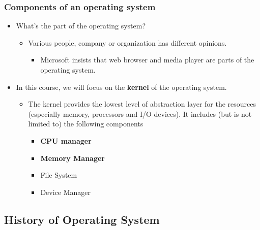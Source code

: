\documentclass[CJKutf8,xcolor=pdftex,dvipsnames,table]{beamer}
\begin{document}
\begin{CJK*}{UTF8}{song}
  \begin{frame}
    \frametitle{Components of an operating system} \pause
	  \begin{itemize}
	  \item{What's the part of the operating system?} \pause
	    \begin{itemize}
	    \item{Various people, company or organization has different opinions.} \pause
	      \begin{itemize}
	      \item{Microsoft insists that web browser and media player are parts of the operating system.} \pause
	      \end{itemize}
	    \end{itemize}
	  \item{In this course, we will focus on the \textbf{kernel} of the operating system.} \pause
	    \begin{itemize}
	    \item{The kernel provides the lowest level of abstraction layer for the resources (especially memory, processors and I/O devices). It includes (but is not limited to) the following components} \pause
	      \begin{itemize}
	      \item{\textbf{CPU manager}} \pause
	      \item{\textbf{Memory Manager}} \pause
	      \item{File System} \pause
	      \item{Device Manager}
	      \end{itemize}
	    \end{itemize}
	  \end{itemize}
  \end{frame}

  \subsection{History of Operating System}


\end{CJK*}
\end{document}
